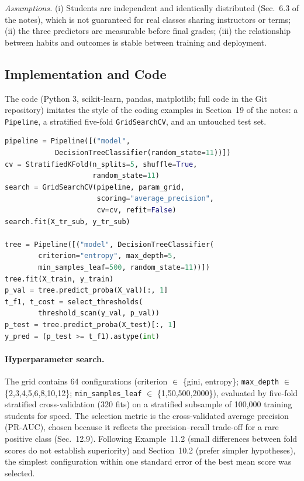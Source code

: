 \documentclass[12pt,a4paper]{article}
\theoremstyle{definition}
\begin{document}
\emph{Assumptions.} (i) Students are independent and identically distributed (Sec.~6.3 of the notes), which is not guaranteed for real classes sharing instructors or terms; (ii) the three predictors are measurable before final grades; (iii) the relationship between habits and outcomes is stable between training and deployment.

\subsection{Implementation and Code}

The code (Python 3, scikit-learn, pandas, matplotlib; full code in the Git repository) imitates the style of the coding examples in Section~19 of the notes: a \texttt{Pipeline}, a stratified five-fold \texttt{GridSearchCV}, and an untouched test set.

\begin{lstlisting}[language=Python]
pipeline = Pipeline([("model",
            DecisionTreeClassifier(random_state=11))])
cv = StratifiedKFold(n_splits=5, shuffle=True,
                     random_state=11)
search = GridSearchCV(pipeline, param_grid,
                      scoring="average_precision",
                      cv=cv, refit=False)
search.fit(X_tr_sub, y_tr_sub)

tree = Pipeline([("model", DecisionTreeClassifier(
        criterion="entropy", max_depth=5,
        min_samples_leaf=500, random_state=11))])
tree.fit(X_train, y_train)
p_val = tree.predict_proba(X_val)[:, 1]
t_f1, t_cost = select_thresholds(
        threshold_scan(y_val, p_val))
p_test = tree.predict_proba(X_test)[:, 1]
y_pred = (p_test >= t_f1).astype(int)
\end{lstlisting}

\paragraph{Hyperparameter search.} The grid contains 64 configurations (criterion $\in$ \{gini, entropy\}; \texttt{max\_depth} $\in$ \{2,3,4,5,6,8,10,12\}; \texttt{min\_samples\_leaf} $\in$ \{1,50,500,2000\}), evaluated by five-fold stratified cross-validation (320 fits) on a stratified subsample of 100{,}000 training students for speed. The selection metric is the cross-validated average precision (PR-AUC), chosen because it reflects the precision--recall trade-off for a rare positive class (Sec.~12.9). Following Example~11.2 (small differences between fold scores do not establish superiority) and Section~10.2 (prefer simpler hypotheses), the simplest configuration within one standard error of the best mean score was selected.
\end{document}
